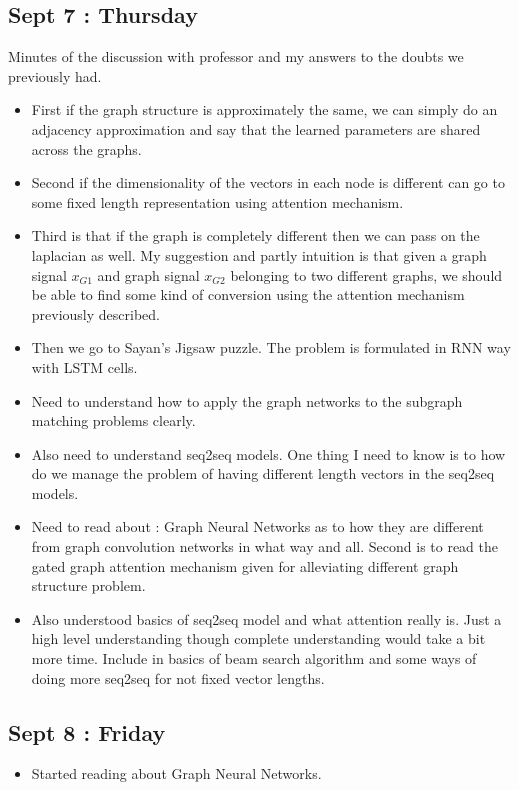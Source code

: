 \documentclass{article}
\begin{document}
\subsection{Sept 7 : Thursday}
Minutes of the discussion with professor and my answers to the doubts we previously had.
\begin{itemize}
\item First if the graph structure is approximately the same, we can simply do an adjacency approximation and say that the learned parameters are shared across the graphs.
\item Second if the dimensionality of the vectors in each node is different can go to some fixed length representation using attention mechanism.
\item Third is that if the graph is completely different then we can pass on the laplacian as well. My suggestion and partly intuition is that given a graph signal $x_{G1}$ and graph signal $x_{G2}$ belonging to two different graphs, we should be able to find some kind of conversion using the attention mechanism previously described.
\item Then we go to Sayan's Jigsaw puzzle. The problem is formulated in RNN way with LSTM cells.
\item Need to understand how to apply the graph networks to the subgraph matching problems clearly.
\item Also need to understand seq2seq models. One thing I need to know is to how do we manage the problem of having different length vectors in the seq2seq models.
\item Need to read about : Graph Neural Networks as to how they are different from graph convolution networks in what way and all. Second is to read the gated graph attention mechanism given for alleviating different graph structure problem.
\item Also understood basics of seq2seq model and what attention really is. Just a high level understanding though complete understanding would take a bit more time. Include in basics of beam search algorithm and some ways of doing more seq2seq for not fixed vector lengths.
\end{itemize}

\subsection{Sept 8 : Friday}
\begin{itemize}
\item Started reading about Graph Neural Networks.
\end{itemize}




\end{document}
